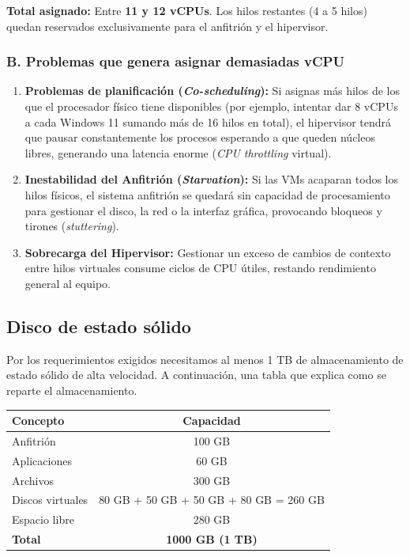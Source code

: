 \documentclass[11.5pt]{article}
\begin{document}
	\textbf{Total asignado:} Entre \textbf{11 y 12 vCPUs}. Los hilos restantes (4 a 5 hilos) quedan reservados exclusivamente para el anfitrión y el hipervisor.
	
	\subsubsection*{B. Problemas que genera asignar demasiadas vCPU}
	
	\begin{enumerate}
		\item \textbf{Problemas de planificación (\textit{Co-scheduling}):} Si asignas más hilos de los que el procesador físico tiene disponibles (por ejemplo, intentar dar 8 vCPUs a cada Windows 11 sumando más de 16 hilos en total), el hipervisor tendrá que pausar constantemente los procesos esperando a que queden núcleos libres, generando una latencia enorme (\textit{CPU throttling} virtual).
		
		\item \textbf{Inestabilidad del Anfitrión (\textit{Starvation}):} Si las VMs acaparan todos los hilos físicos, el sistema anfitrión se quedará sin capacidad de procesamiento para gestionar el disco, la red o la interfaz gráfica, provocando bloqueos y tirones (\textit{stuttering}).
		
		\item \textbf{Sobrecarga del Hipervisor:} Gestionar un exceso de cambios de contexto entre hilos virtuales consume ciclos de CPU útiles, restando rendimiento general al equipo.
	\end{enumerate}
	
	\subsection{Disco de estado sólido}
	
	Por los requerimientos exigidos necesitamos al menos 1 TB de almacenamiento de estado sólido de alta velocidad. A continuación, una tabla que explica como se reparte el almacenamiento.
	
	\begin{tabular}{|l|c|}
		\hline
		\textbf{Concepto} & \textbf{Capacidad} \\
		\hline
		Anfitrión & 100 GB \\
		\hline
		Aplicaciones & 60 GB \\
		\hline
		Archivos & 300 GB \\
		\hline
		Discos virtuales & 80 GB + 50 GB + 50 GB + 80 GB = 260 GB \\
		\hline
		Espacio libre & 280 GB \\
		\hline
		\textbf{Total} & \textbf{1000 GB (1 TB)} \\
		\hline
	\end{tabular}
	
\end{document}
